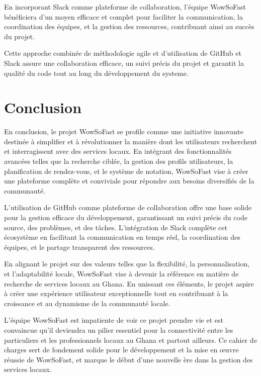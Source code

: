 En incorporant Slack comme plateforme de collaboration, l'équipe WowSoFast bénéficiera d'un moyen efficace et complet pour faciliter la communication, la coordination des équipes, et la gestion des ressources, contribuant ainsi au succès du projet.
\vspace{1cm}

Cette approche combinée de méthodologie agile et d'utilisation de GitHub et Slack assure une collaboration efficace, un suivi précis du projet et garantit la qualité du code tout au long du développement du systeme.

\vspace{1.5cm}

\section*{Conclusion}

En conclusion, le projet WowSoFast se profile comme une initiative innovante destinée à simplifier et à révolutionner la manière dont les utilisateurs recherchent et interragissent avec des services locaux. En intégrant des fonctionnalités avancées telles que la recherche ciblée, la gestion des profils utilisateurs, la planification de rendez-vous, et le système de notation, WowSoFast vise à créer une plateforme complète et conviviale pour répondre aux besoins diversifiés de la communauté.

\vspace{0.5cm}

L'utilisation de GitHub comme plateforme de collaboration offre une base solide pour la gestion efficace du développement, garantissant un suivi précis du code source, des problèmes, et des tâches. L'intégration de Slack complète cet écosystème en facilitant la communication en temps réel, la coordination des équipes, et le partage transparent des ressources.

\vspace{0.5cm}

En alignant le projet sur des valeurs telles que la flexibilité, la personnalisation, et l'adaptabilité locale, WowSoFast vise à devenir la référence en matière de recherche de services locaux au Ghana. En unissant ces éléments, le projet aspire à créer une expérience utilisateur exceptionnelle tout en contribuant à la croissance et au dynamisme de la communauté locale.

\vspace{0.5cm}

L'équipe WowSoFast est impatiente de voir ce projet prendre vie et est convaincue qu'il deviendra un pilier essentiel pour la connectivité entre les particuliers et les professionnels locaux au Ghana et partout ailleurs. Ce cahier de charges sert de fondement solide pour le développement et la mise en œuvre réussie de WowSoFast, et marque le début d'une nouvelle ère dans la gestion des services locaux.

